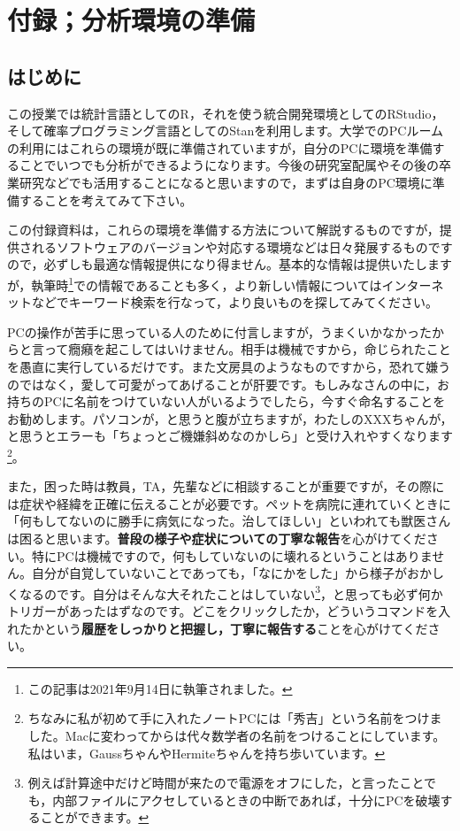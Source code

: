 \documentclass{ltjsbook}
\begin{document}
 
\VerbatimFootnotes
\chapter{付録；分析環境の準備}
\label{Appendix} 
\section{はじめに}
この授業では統計言語としてのR，それを使う統合開発環境としてのRStudio，そして確率プログラミング言語としてのStanを利用します。大学でのPCルームの利用にはこれらの環境が既に準備されていますが，自分のPCに環境を準備することでいつでも分析ができるようになります。今後の研究室配属やその後の卒業研究などでも活用することになると思いますので，まずは自身のPC環境に準備することを考えてみて下さい。

この付録資料は，これらの環境を準備する方法について解説するものですが，提供されるソフトウェアのバージョンや対応する環境などは日々発展するものですので，必ずしも最適な情報提供になり得ません。基本的な情報は提供いたしますが，執筆時\footnote{この記事は2021年9月14日に執筆されました。}での情報であることも多く，より新しい情報についてはインターネットなどでキーワード検索を行なって，より良いものを探してみてください。

PCの操作が苦手に思っている人のために付言しますが，うまくいかなかったからと言って癇癪を起こしてはいけません。相手は機械ですから，命じられたことを愚直に実行しているだけです。また文房具のようなものですから，恐れて嫌うのではなく，愛して可愛がってあげることが肝要です。もしみなさんの中に，お持ちのPCに名前をつけていない人がいるようでしたら，今すぐ命名することをお勧めします。パソコンが，と思うと腹が立ちますが，わたしのXXXちゃんが，と思うとエラーも「ちょっとご機嫌斜めなのかしら」と受け入れやすくなります\footnote{ちなみに私が初めて手に入れたノートPCには「秀吉」という名前をつけました。Macに変わってからは代々数学者の名前をつけることにしています。私はいま，GaussちゃんやHermiteちゃんを持ち歩いています。}。

また，困った時は教員，TA，先輩などに相談することが重要ですが，その際には症状や経緯を正確に伝えることが必要です。ペットを病院に連れていくときに「何もしてないのに勝手に病気になった。治してほしい」といわれても獣医さんは困ると思います。\textbf{普段の様子や症状についての丁寧な報告}を心がけてください。特にPCは機械ですので，何もしていないのに壊れるということはありません。自分が自覚していないことであっても，「なにかをした」から様子がおかしくなるのです。自分はそんな大それたことはしていない\footnote{例えば計算途中だけど時間が来たので電源をオフにした，と言ったことでも，内部ファイルにアクセしているときの中断であれば，十分にPCを破壊することができます。}，と思っても必ず何かトリガーがあったはずなのです。どこをクリックしたか，どういうコマンドを入れたかという\textbf{履歴をしっかりと把握し，丁寧に報告する}ことを心がけてください。
\end{document}
